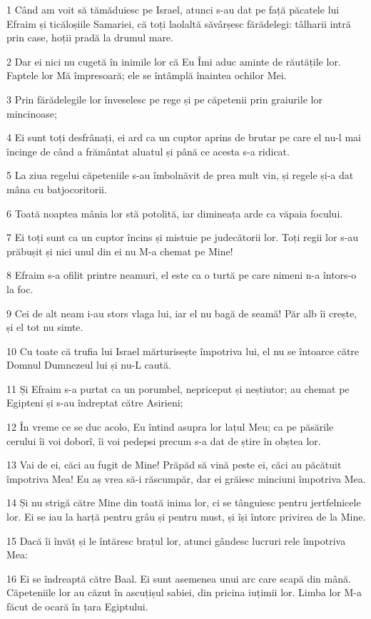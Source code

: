 \par 1 Când am voit să tămăduiesc pe Israel, atunci s-au dat pe față păcatele lui Efraim și ticăloșiile Samariei, că toți laolaltă săvârșesc fărădelegi: tâlharii intră prin case, hoții pradă la drumul mare.
\par 2 Dar ei nici nu cugetă în inimile lor că Eu Îmi aduc aminte de răutățile lor. Faptele lor Mă împresoară; ele se întâmplă înaintea ochilor Mei.
\par 3 Prin fărădelegile lor înveselesc pe rege și pe căpetenii prin graiurile lor mincinoase;
\par 4 Ei sunt toți desfrânați, ei ard ca un cuptor aprins de brutar pe care el nu-l mai încinge de când a frământat aluatul și până ce acesta s-a ridicat.
\par 5 La ziua regelui căpeteniile s-au îmbolnăvit de prea mult vin, și regele și-a dat mâna cu batjocoritorii.
\par 6 Toată noaptea mânia lor stă potolită, iar dimineața arde ca văpaia focului.
\par 7 Ei toți sunt ca un cuptor încins și mistuie pe judecătorii lor. Toți regii lor s-au prăbușit și nici unul din ei nu M-a chemat pe Mine!
\par 8 Efraim s-a ofilit printre neamuri, el este ca o turtă pe care nimeni n-a întors-o la foc.
\par 9 Cei de alt neam i-au stors vlaga lui, iar el nu bagă de seamă! Păr alb îi crește, și el tot nu simte.
\par 10 Cu toate că trufia lui Israel mărturisește împotriva lui, el nu se întoarce către Domnul Dumnezeul lui și nu-L caută.
\par 11 Și Efraim s-a purtat ca un porumbel, nepriceput și neștiutor; au chemat pe Egipteni și s-au îndreptat către Asirieni;
\par 12 În vreme ce se duc acolo, Eu întind asupra lor lațul Meu; ca pe păsările cerului îi voi doborî, îi voi pedepsi precum s-a dat de știre în obștea lor.
\par 13 Vai de ei, căci au fugit de Mine! Prăpăd să vină peste ei, căci au păcătuit împotriva Mea! Eu aș vrea să-i răscumpăr, dar ei grăiesc minciuni împotriva Mea.
\par 14 Și nu strigă către Mine din toată inima lor, ci se tânguiesc pentru jertfelnicele lor. Ei se iau la harță pentru grâu și pentru must, și își întorc privirea de la Mine.
\par 15 Dacă îi învăț și le întăresc brațul lor, atunci gândesc lucruri rele împotriva Mea:
\par 16 Ei se îndreaptă către Baal. Ei sunt asemenea unui arc care scapă din mână. Căpeteniile lor au căzut în ascuțișul sabiei, din pricina iuțimii lor. Limba lor M-a făcut de ocară în țara Egiptului.

